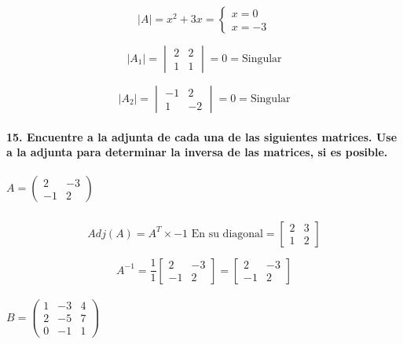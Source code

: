 \documentclass[
]{article}
\begin{document}
\[
|A| = x^2+3x = \begin{cases}
    x = 0\\
    x = -3
\end{cases}
\]

\[
|A_1| = \begin{vmatrix}
    2&2\\1&1
\end{vmatrix} = 0 = \text{Singular}
\]

\[
|A_2| = \begin{vmatrix}
        -1&2\\1&-2
\end{vmatrix} = 0 = \text{Singular}
\]

\hypertarget{encuentre-a-la-adjunta-de-cada-una-de-las-siguientes-matrices.-use-a-la-adjunta-para-determinar-la-inversa-de-las-matrices-si-es-posible.}{%
\paragraph{15. Encuentre a la adjunta de cada una de las siguientes
matrices. Use a la adjunta para determinar la inversa de las matrices,
si es
posible.}\label{encuentre-a-la-adjunta-de-cada-una-de-las-siguientes-matrices.-use-a-la-adjunta-para-determinar-la-inversa-de-las-matrices-si-es-posible.}}

\hypertarget{a-beginpmatrix2-3-12endpmatrix}{%
\subparagraph{\texorpdfstring{\(A = \begin{pmatrix}2&-3\\-1&2\end{pmatrix}\)}{A = \textbackslash begin\{pmatrix\}2\&-3\textbackslash\textbackslash-1\&2\textbackslash end\{pmatrix\}}}\label{a-beginpmatrix2-3-12endpmatrix}}

\[
Adj(A) = A^T \times -1 \text{ En su diagonal} = \begin{bmatrix}
    2&3\\1&2
\end{bmatrix}
\]

\[
A^{-1} = \frac{1}{1}\begin{bmatrix}
    2&-3\\-1&2
\end{bmatrix} = \begin{bmatrix}
    2&-3\\-1&2
\end{bmatrix}
\]

\hypertarget{b-beginpmatrix1-342-570-11endpmatrix}{%
\subparagraph{\texorpdfstring{\(B = \begin{pmatrix}1&-3&4\\2&-5&7\\0&-1&1\end{pmatrix}\)}{B = \textbackslash begin\{pmatrix\}1\&-3\&4\textbackslash\textbackslash2\&-5\&7\textbackslash\textbackslash0\&-1\&1\textbackslash end\{pmatrix\}}}\label{b-beginpmatrix1-342-570-11endpmatrix}}
\end{document}
